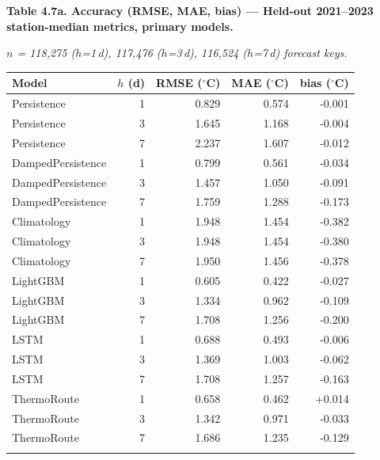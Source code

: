 
\begin{table}[htbp]
\centering
\footnotesize
\setlength{\tabcolsep}{4pt}
\renewcommand{\arraystretch}{1.1}
\textbf{Table 4.7a. Accuracy (RMSE, MAE, bias) --- Held-out 2021--2023 station-median metrics, primary models.}
\par\smallskip
\textit{$n$ = 118,275 ($h$=1\,d), 117,476 ($h$=3\,d), 116,524 ($h$=7\,d) forecast keys.}
\par\medskip
\begin{tabular}{@{}lrrrr@{}}
\toprule\noalign{}
Model & $h$ (d) & RMSE ($^\circ$C) & MAE ($^\circ$C) & bias ($^\circ$C) \\
\midrule\noalign{}
Persistence & 1 & 0.829 & 0.574 & -0.001 \\
Persistence & 3 & 1.645 & 1.168 & -0.004 \\
Persistence & 7 & 2.237 & 1.607 & -0.012 \\
DampedPersistence & 1 & 0.799 & 0.561 & -0.034 \\
DampedPersistence & 3 & 1.457 & 1.050 & -0.091 \\
DampedPersistence & 7 & 1.759 & 1.288 & -0.173 \\
Climatology & 1 & 1.948 & 1.454 & -0.382 \\
Climatology & 3 & 1.948 & 1.454 & -0.380 \\
Climatology & 7 & 1.950 & 1.456 & -0.378 \\
LightGBM & 1 & 0.605 & 0.422 & -0.027 \\
LightGBM & 3 & 1.334 & 0.962 & -0.109 \\
LightGBM & 7 & 1.708 & 1.256 & -0.200 \\
LSTM & 1 & 0.688 & 0.493 & -0.006 \\
LSTM & 3 & 1.369 & 1.003 & -0.062 \\
LSTM & 7 & 1.708 & 1.257 & -0.163 \\
ThermoRoute & 1 & 0.658 & 0.462 & +0.014 \\
ThermoRoute & 3 & 1.342 & 0.971 & -0.033 \\
ThermoRoute & 7 & 1.686 & 1.235 & -0.129 \\
\bottomrule\noalign{}
\end{tabular}
\end{table}


